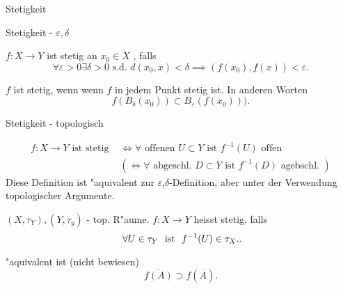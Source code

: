 \documentclass[class=article, crop=false]{standalone}
\begin{document}
\begin{zettel}{Stetigkeit}
\begin{flashcard}

    \begin{question}
        Stetigkeit - $\varepsilon, \delta $ 
    \end{question}

\begin{definition}[Stetigkeit]
    $f:X \longrightarrow Y$ ist stetig an $x_0 \in  X$ , falls
\[
    \forall \varepsilon >  0 \exists  \delta  > 0 \text{ s.d. }  d (x_0 , x) < \delta \implies (f (x_0), f (x)) <  \varepsilon
.\]

    $f$ ist stetig, wenn wenn $f$ in jedem Punkt stetig ist.
    In anderen Worten
\[
    f (B_{\delta }(x_0)) \subset B_{\varepsilon } (f (x_0)) )
.\]
\end{definition}
\end{flashcard}

\begin{flashcard}
\begin{question}
    Stetigkeit - topologisch
\end{question}
\begin{definition}[Stetigkeit]
\begin{align*}
    f:X \longrightarrow Y \text{ ist stetig }  &\iff \forall \text{ offenen } U \subset Y \text{ ist } f^{-1} (U) \text{ offen } \\
                                               &( \iff \forall  \text{ abgeschl. } D \subset Y \text{ ist } f^{-1} (D) \text{ agebschl. } )
\end{align*}
    Diese Definition ist "aquivalent zur $\varepsilon $,$\delta$-Definition, aber unter der Verwendung topologischer Argumente.
\end{definition}
\end{flashcard}

\begin{definition}[Stetigkeit]
   $(X, \tau_Y), (Y, \tau_y)$  - top. R"aume. $f:X \longrightarrow Y$ heisst stetig, falls
   \[
       \forall U \in  \tau_Y \tx{ ist } f^{-1} (U) \in  \tau_X.
   .\]
\end{definition}

"aquivalent ist (nicht bewiesen)
\[
    \overline{f(A)} \supset f (\overline{A}) 
.\]

\end{zettel}
\end{document}
